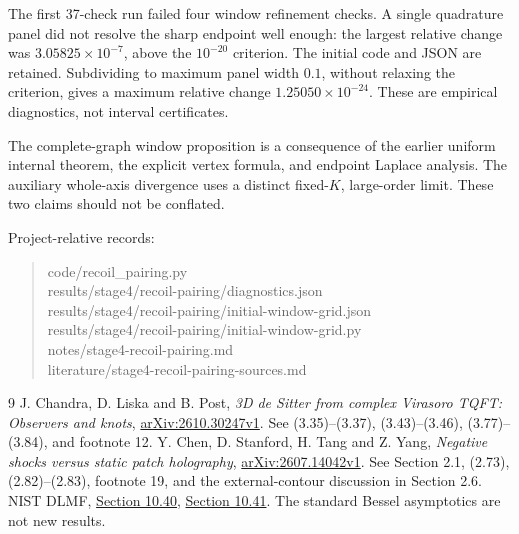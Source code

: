 \documentclass[11pt,a4paper]{article}
\begin{document}
The first 37-check run failed four window refinement checks.
A single quadrature panel did not resolve the sharp endpoint
well enough: the largest relative change was
\(3.05825\times10^{-7}\), above the \(10^{-20}\) criterion.
The initial code and JSON are retained.
Subdividing to maximum panel width \(0.1\), without relaxing the
criterion, gives a maximum relative change \(1.25050\times10^{-24}\).
These are empirical diagnostics, not interval certificates.

The complete-graph window proposition is a consequence of the earlier
uniform internal theorem, the explicit vertex formula, and endpoint
Laplace analysis. The auxiliary whole-axis divergence uses a distinct
fixed-\(K\), large-order limit. These two claims should not be conflated.

\small
Project-relative records:
\begin{quote}\footnotesize
code/recoil\_pairing.py\\
results/stage4/recoil-pairing/diagnostics.json\\
results/stage4/recoil-pairing/initial-window-grid.json\\
results/stage4/recoil-pairing/initial-window-grid.py\\
notes/stage4-recoil-pairing.md\\
literature/stage4-recoil-pairing-sources.md
\end{quote}
\begin{thebibliography}{9}
 J. Chandra, D. Liska and B. Post,
\emph{3D de Sitter from complex Virasoro TQFT: Observers and knots},
\href{https://arxiv.org/abs/2610.30247v1}{arXiv:2610.30247v1}.
See (3.35)--(3.37), (3.43)--(3.46), (3.77)--(3.84), and footnote 12.
 Y. Chen, D. Stanford, H. Tang and Z. Yang,
\emph{Negative shocks versus static patch holography},
\href{https://arxiv.org/abs/2607.14042v1}{arXiv:2607.14042v1}.
See Section 2.1, (2.73), (2.82)--(2.83), footnote 19,
and the external-contour discussion in Section 2.6.
 NIST DLMF,
\href{https://dlmf.nist.gov/10.40}{Section 10.40},
\href{https://dlmf.nist.gov/10.41}{Section 10.41}.
The standard Bessel asymptotics are not new results.
\end{thebibliography}
\end{document}
